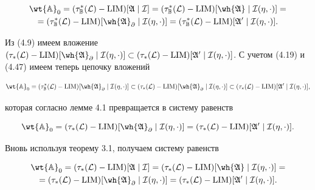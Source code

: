 \begin{multline}


\wt{\Bbb A}_0=(\tau^*_{\Bbb B}(\cal L)-


\LIM)[\frak A\mid\cal I]=(\tau^*_{\Bbb B}(\cal L)-


\LIM)[\wh{\frak A}\mid\cal I(\eta,\cdot)]=\\


=(\tau^*_{\Bbb B}(\cal L)-\LIM)[


\wh{\frak A}_\partial\mid\cal I(\eta,\cdot)]=


(\tau^*_{\Bbb B}(\cal L)-\LIM)[\frak A^0\mid\cal I(\eta,\cdot)].


\end{multline}


Из (4.9) имеем вложение $(\tau_*(\cal L)-\LIM)[


\wh{\frak A}_\partial\mid\cal I(\eta,\cdot)]\subset


(\tau_*(\cal L)-\LIM)[\frak A^0\mid\cal I(\eta,


\cdot)]$. С учетом (4.19) и (4.47) имеем теперь цепочку вложений


$$


\wt{\Bbb A}_0=(\tau^*_{\Bbb B}(\cal L)-


\LIM)[\wh{\frak A}_\partial\mid\cal I(\eta,\cdot)]\subset


(\tau_*(\cal L)-\LIM)[\wh{\frak A}_\partial\mid


\cal I(\eta,\cdot)]\subset


(\tau_*(\cal L)-\LIM)[\frak A^0\mid\cal I(\eta,\cdot)],


$$


которая согласно лемме 4.1 превращается в систему равенств


$$


\wt{\Bbb A}_0=(\tau_*(\cal L)-\LIM)[


\wh{\frak A}_\partial\mid\cal I(\eta,\cdot)]=


(\tau_*(\cal L)-\LIM)[\frak A^0\mid\cal I(\eta,\cdot)].


$$


Вновь используя теорему 3.1, получаем систему равенств


\begin{multline}


\wt{\Bbb A}_0=(\tau_*(\cal L)-


\LIM)[\frak A\mid\cal I]=(\tau_*(\cal L)-


\LIM)[\wh{\frak A}\mid\cal I(\eta,\cdot)]=\\


=(\tau_*(\cal L)-\LIM)[\wh{\frak A}_\partial


\mid\cal I(\eta,\cdot)]=(\tau_*(\cal L)-


\LIM)[\frak A^0\mid\cal I(\eta,\cdot)].


\end{multline}


